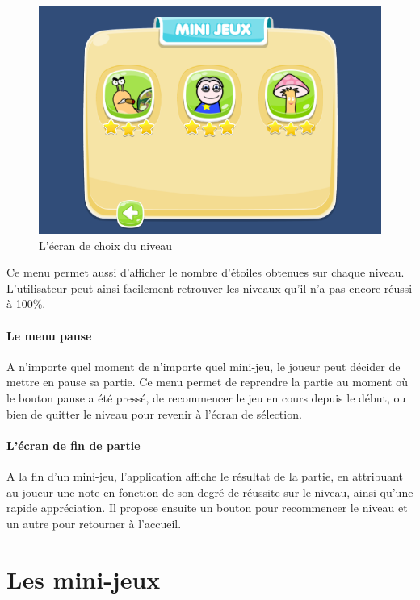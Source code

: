 \begin{figure}[H]\centering
  \includegraphics[scale=0.6]{./img/resultat_niveaux.png}
  \caption{L'écran de choix du niveau}
  \label{choix_niveau}
\end{figure}

Ce menu permet aussi d'afficher le nombre d'étoiles obtenues sur chaque niveau. L'utilisateur peut ainsi facilement retrouver les niveaux qu'il n'a pas encore réussi à 100\%.

\paragraph{Le menu pause}

A n'importe quel moment de n'importe quel mini-jeu, le joueur peut décider de mettre en pause sa partie. Ce menu permet de reprendre la partie au moment où le bouton pause a été pressé, de recommencer le jeu en cours depuis le début, ou bien de quitter le niveau pour revenir à l'écran de sélection.

\paragraph{L'écran de fin de partie}

A la fin d'un mini-jeu, l'application affiche le résultat de la partie, en attribuant au joueur une note en fonction de son degré de réussite sur le niveau, ainsi qu'une rapide appréciation. Il propose ensuite un bouton pour recommencer le niveau et un autre pour retourner à l'accueil.

\section*{Les mini-jeux}

